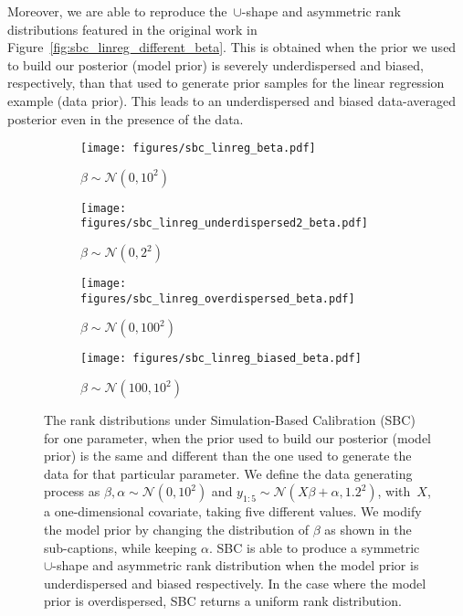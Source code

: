 \documentclass[twoside]{article}
\begin{document}
Moreover, we are able to reproduce the~$\cup$-shape and asymmetric rank distributions featured in the original work in Figure~\ref{fig:sbc_linreg_different_beta}. This is obtained when the prior we used to build our posterior (model prior) is severely underdispersed and biased, respectively, than that used to generate prior samples for the linear regression example (data prior). This leads to an underdispersed and biased data-averaged posterior even in the presence of the data.

\begin{figure*}
\vspace*{-6pt}
\begin{center}
\begin{subfigure}[t]{.24\textwidth}
  \texttt{[image: figures/sbc\_linreg\_beta.pdf]}
  \vspace*{-12pt}
  \caption{$\beta \sim \mathcal{N}(0, 10^2)$}
  \label{fig:sbc_linreg_beta}
\end{subfigure}
\hspace*{.001\textwidth}
\begin{subfigure}[t]{.24\textwidth}
  \texttt{[image: figures/sbc\_linreg\_underdispersed2\_beta.pdf]}
  \vspace*{-12pt}
  \caption{$\beta \sim \mathcal{N}(0, 2^2)$}
  \label{fig:sbc_linreg_underdispersed2_beta}
\end{subfigure}
\hspace*{.001\textwidth}
\begin{subfigure}[t]{.24\textwidth}
  \texttt{[image: figures/sbc\_linreg\_overdispersed\_beta.pdf]}
  \vspace*{-12pt}
  \caption{$\beta \sim \mathcal{N}(0, 100^2)$}
  \label{fig:sbc_linreg_overdispersed_beta}
\end{subfigure}
\hspace*{.001\textwidth}
\begin{subfigure}[t]{.24\textwidth}
  \texttt{[image: figures/sbc\_linreg\_biased\_beta.pdf]}
  \vspace*{-12pt}
  \caption{$\beta \sim \mathcal{N}(100, 10^2)$}
  \label{fig:sbc_linreg_biased_beta}
\end{subfigure}
\end{center}
\vspace*{-6pt}
\caption{The rank distributions under Simulation-Based Calibration (SBC) for one parameter, when the prior used to build our posterior (model prior) is the same and different than the one used to generate the data for that particular parameter. We define the data generating process as $\beta, \alpha \sim \mathcal{N}(0, 10^2)$ and ${y_{1:5} \sim \mathcal{N}(X\beta + \alpha, 1.2^2)}$, with~$X$, a one-dimensional covariate, taking five different values. We modify the model prior by changing the distribution of $\beta$ as shown in the sub-captions, while keeping $\alpha$. SBC is able to produce a symmetric $\cup$-shape and asymmetric rank distribution when the model prior is underdispersed and biased respectively. In the case where the model prior is overdispersed, SBC returns a uniform rank distribution.}

\end{figure*}
\end{document}
